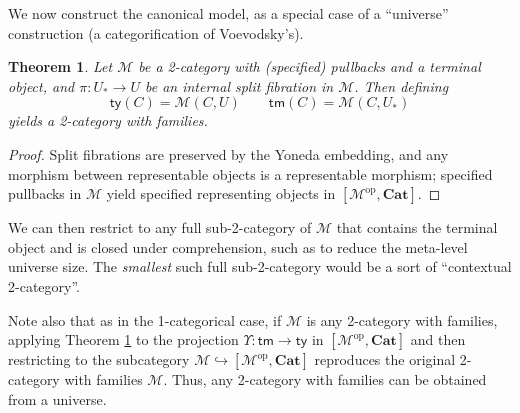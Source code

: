 \documentclass[10pt]{article}
\newtheorem{theorem}{Theorem}
\theoremstyle{definition}
\newcommand\op{^{\mathrm{op}}}
\newcommand\Cat{\mathbf{Cat}}
\newcommand\M{\mathcal{M}}
\newcommand\Mty{\mathsf{ty}}
\newcommand\Mtm{\mathsf{tm}}
\newcommand\Ups{\Upsilon}
\newcommand\Un{U}
\newcommand\Ub{U_*}
\begin{document}
We now construct the canonical model, as a special case of a ``universe'' construction (a categorification of Voevodsky's).

\begin{theorem}\label{thm:2cwf-univ}
  Let $\M$ be a 2-category with (specified) pullbacks and a terminal object, and $\pi:\Ub\to\Un$ be an internal split fibration in $\M$.
  Then defining
  \[ \Mty(C) = \M(C,\Un) \qquad \Mtm(C) = \M(C,\Ub) \]
  yields a 2-category with families.
\end{theorem}
\begin{proof}
  Split fibrations are preserved by the Yoneda embedding, and any morphism between representable objects is a representable morphism; specified pullbacks in $\M$ yield specified representing objects in $[\M\op,\Cat]$.
\end{proof}

We can then restrict to any full sub-2-category of $\M$ that contains the terminal object and is closed under comprehension, such as to reduce the meta-level universe size.
The \emph{smallest} such full sub-2-category would be a sort of ``contextual 2-category''.

Note also that as in the 1-categorical case, if $\M$ is any 2-category with families, applying Theorem \ref{thm:2cwf-univ} to the projection $\Ups:\Mtm \to \Mty$ in $[\M\op,\Cat]$ and then restricting to the subcategory $\M \hookrightarrow [\M\op,\Cat]$ reproduces the original 2-category with families $\M$.
Thus, any 2-category with families can be obtained from a universe.
\end{document}
